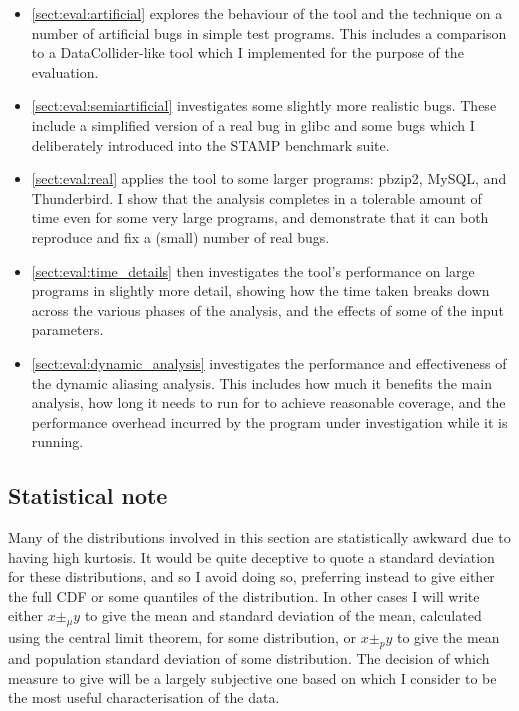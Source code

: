 \begin{itemize}
\item \autoref{sect:eval:artificial} explores the behaviour of the
  tool and the technique on a number of artificial bugs in simple test
  programs.  This includes a comparison to a
  DataCollider\needCite{}-like tool which I implemented for the
  purpose of the evaluation.
\item \autoref{sect:eval:semiartificial} investigates some
  slightly more realistic bugs.  These include a simplified version of
  a real bug in glibc\needCite{} and some bugs which I deliberately
  introduced into the STAMP benchmark suite\needCite{}.
\item \autoref{sect:eval:real} applies the tool to some larger
  programs: pbzip2\needCite{}, MySQL\needCite{}, and
  Thunderbird\needCite{}.  I show that the analysis completes in a
  tolerable amount of time even for some very large programs, and
  demonstrate that it can both reproduce and fix a (small) number of
  real bugs.
\item \autoref{sect:eval:time_details} then investigates the
  tool's performance on large programs in slightly more detail,
  showing how the time taken breaks down across the various phases of
  the analysis, and the effects of some of the input parameters.
\item \autoref{sect:eval:dynamic_analysis} investigates the
  performance and effectiveness of the dynamic aliasing analysis.
  This includes how much it benefits the main analysis, how long it
  needs to run for to achieve reasonable coverage, and the performance
  overhead incurred by the program under investigation while it is
  running.
\end{itemize}

\subsection{Statistical note}

Many of the distributions involved in this section are statistically
awkward due to having high kurtosis.  It would be quite deceptive to
quote a standard deviation for these distributions, and so I avoid
doing so, preferring instead to give either the full CDF or some
quantiles of the distribution.  In other cases I will write either $x
\pm_\mu y$ to give the mean and standard deviation of the mean,
calculated using the central limit theorem, for some distribution, or
$x \pm_p y$ to give the mean and population standard deviation of some
distribution.  The decision of which measure to give will be a largely
subjective one based on which I consider to be the most useful
characterisation of the data.

